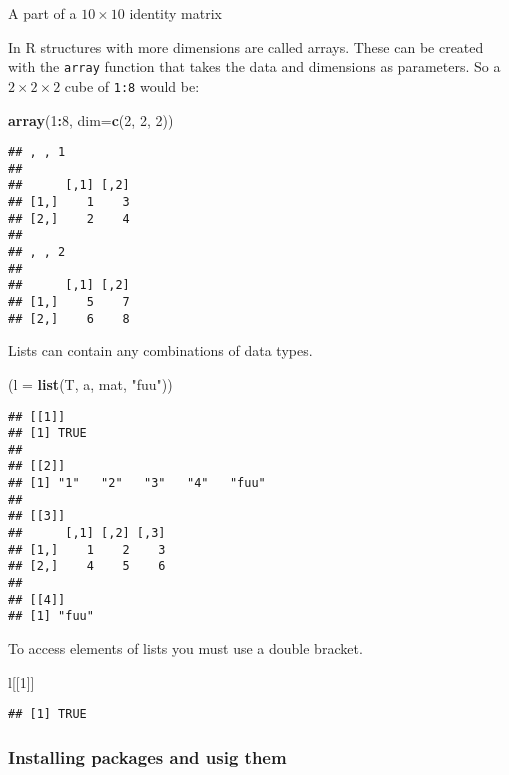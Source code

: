 \documentclass[]{article}
\newenvironment{Shaded}{\begin{snugshade}}{\end{snugshade}}
\newcommand{\KeywordTok}[1]{\textcolor[rgb]{0.13,0.29,0.53}{\textbf{#1}}}
\newcommand{\DataTypeTok}[1]{\textcolor[rgb]{0.13,0.29,0.53}{#1}}
\newcommand{\DecValTok}[1]{\textcolor[rgb]{0.00,0.00,0.81}{#1}}
\newcommand{\StringTok}[1]{\textcolor[rgb]{0.31,0.60,0.02}{#1}}
\newcommand{\OperatorTok}[1]{\textcolor[rgb]{0.81,0.36,0.00}{\textbf{#1}}}
\newcommand{\NormalTok}[1]{#1}
\begin{document}
A part of a \(10\times 10\) identity matrix

In R structures with more dimensions are called arrays. These can be
created with the \texttt{array} function that takes the data and
dimensions as parameters. So a \(2\times 2 \times 2\) cube of
\texttt{1:8} would be:

\begin{Shaded}
\begin{Highlighting}[]
\KeywordTok{array}\NormalTok{(}\DecValTok{1}\OperatorTok{:}\DecValTok{8}\NormalTok{, }\DataTypeTok{dim=}\KeywordTok{c}\NormalTok{(}\DecValTok{2}\NormalTok{, }\DecValTok{2}\NormalTok{, }\DecValTok{2}\NormalTok{))}
\end{Highlighting}
\end{Shaded}

\begin{verbatim}
## , , 1
## 
##      [,1] [,2]
## [1,]    1    3
## [2,]    2    4
## 
## , , 2
## 
##      [,1] [,2]
## [1,]    5    7
## [2,]    6    8
\end{verbatim}

Lists can contain any combinations of data types.

\begin{Shaded}
\begin{Highlighting}[]
\NormalTok{(}\DataTypeTok{l =} \KeywordTok{list}\NormalTok{(T, a, mat, }\StringTok{"fuu"}\NormalTok{))}
\end{Highlighting}
\end{Shaded}

\begin{verbatim}
## [[1]]
## [1] TRUE
## 
## [[2]]
## [1] "1"   "2"   "3"   "4"   "fuu"
## 
## [[3]]
##      [,1] [,2] [,3]
## [1,]    1    2    3
## [2,]    4    5    6
## 
## [[4]]
## [1] "fuu"
\end{verbatim}

To access elements of lists you must use a double bracket.

\begin{Shaded}
\begin{Highlighting}[]
\NormalTok{l[[}\DecValTok{1}\NormalTok{]]}
\end{Highlighting}
\end{Shaded}

\begin{verbatim}
## [1] TRUE
\end{verbatim}

\subsubsection{Installing packages and usig
them}\label{installing-packages-and-usig-them}
\end{document}
